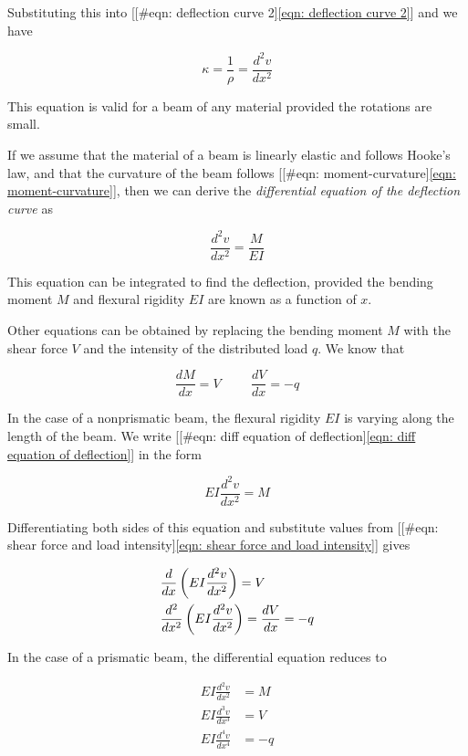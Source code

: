 \documentclass[a4paper,openany,12pt]{book}
\begin{document}
\begin{enumerate}
Substituting this into
[[\#eqn: deflection curve 2]\ref{eqn: deflection curve 2}] and we have

$$\kappa  = \frac{1}{\rho } = \frac{d^2v}{dx^2}$$

This equation is valid for a beam of any material provided the rotations
are small.

If we assume that the material of a beam is linearly elastic and follows
Hooke's law, and that the curvature of the beam follows
[[\#eqn: moment-curvature]\ref{eqn: moment-curvature}], then we can derive
the \emph{differential equation of the deflection curve} as

$$\frac{d^2v}{dx^2} = \frac{M}{EI}$$

This equation can be integrated to find the deflection, provided the
bending moment \(M\) and flexural rigidity \(EI\) are known as a function of
\(x\).

Other equations can be obtained by replacing the bending moment \(M\) with
the shear force \(V\) and the intensity of the distributed load \(q\). We
know that

$$\frac{dM}{dx} = V \hspace{1cm} \frac{dV}{dx} =  - q$$

In the case of a nonprismatic beam, the flexural rigidity \(EI\) is
varying along the length of the beam. We write
[[\#eqn: diff equation of deflection]\ref{eqn: diff equation of deflection}]
in the form

$$EI\frac{d^2v}{dx^2} = M$$

Differentiating both sides of this equation and substitute values from
[[\#eqn: shear force and load intensity]\ref{eqn: shear force and load intensity}]
gives

$$\begin{gathered}
    \frac{d}{dx}\left( EI\frac{d^2v}{dx^2} \right) = V \hfill \\
    \frac{d^2}{dx^2}\left( EI\frac{d^2v}{dx^2} \right) = \frac{dV}{dx} =  -q \hfill \\ 
  \end{gathered}$$

In the case of a prismatic beam, the differential equation reduces to

$$\begin{aligned}
  EI\frac{d^2v}{dx^2} &= M \nonumber \\
  EI\frac{d^3v}{dx^3} &= V \nonumber \\
  EI\frac{d^4v}{dx^4} &=  - q \end{aligned}$$


\end{enumerate}
\end{document}
